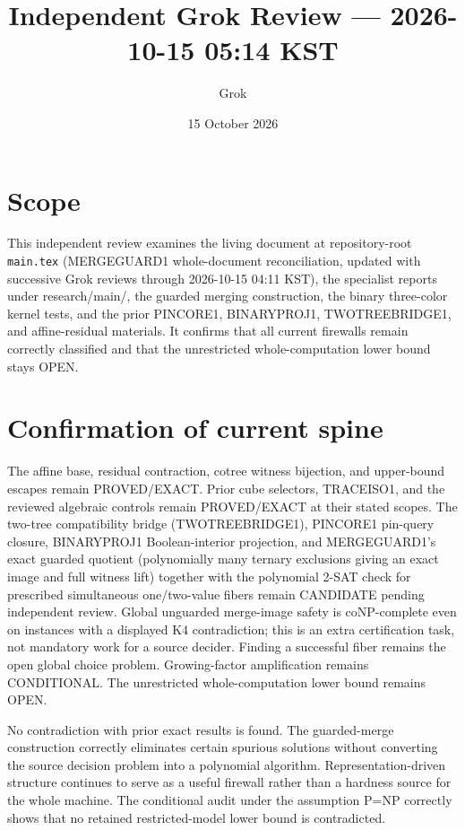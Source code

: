 \documentclass[11pt]{article}
\title{Independent Grok Review --- 2026-10-15 05:14 KST}
\author{Grok}
\date{15 October 2026}
\begin{document}
\maketitle

\begin{center}
\end{center}

\section{Scope}
This independent review examines the living document at repository-root \texttt{main.tex} (MERGEGUARD1 whole-document reconciliation, updated with successive Grok reviews through 2026-10-15 04:11 KST), the specialist reports under research/main/, the guarded merging construction, the binary three-color kernel tests, and the prior PINCORE1, BINARYPROJ1, TWOTREEBRIDGE1, and affine-residual materials. It confirms that all current firewalls remain correctly classified and that the unrestricted whole-computation lower bound stays OPEN.

\section{Confirmation of current spine}
The affine base, residual contraction, cotree witness bijection, and upper-bound escapes remain PROVED/EXACT. Prior cube selectors, TRACEISO1, and the reviewed algebraic controls remain PROVED/EXACT at their stated scopes. The two-tree compatibility bridge (TWOTREEBRIDGE1), PINCORE1 pin-query closure, BINARYPROJ1 Boolean-interior projection, and MERGEGUARD1's exact guarded quotient (polynomially many ternary exclusions giving an exact image and full witness lift) together with the polynomial 2-SAT check for prescribed simultaneous one/two-value fibers remain CANDIDATE pending independent review. Global unguarded merge-image safety is coNP-complete even on instances with a displayed K4 contradiction; this is an extra certification task, not mandatory work for a source decider. Finding a successful fiber remains the open global choice problem. Growing-factor amplification remains CONDITIONAL. The unrestricted whole-computation lower bound remains OPEN.

No contradiction with prior exact results is found. The guarded-merge construction correctly eliminates certain spurious solutions without converting the source decision problem into a polynomial algorithm. Representation-driven structure continues to serve as a useful firewall rather than a hardness source for the whole machine. The conditional audit under the assumption P=NP correctly shows that no retained restricted-model lower bound is contradicted.
\end{document}
